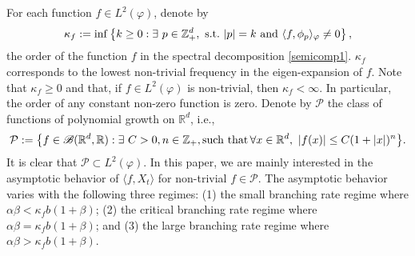 \documentclass[12pt,a4paper]{amsart}
\theoremstyle{plain}
\theoremstyle{definition}
\numberwithin{equation}{section}
\begin{document}
For each function $f\in L^2(\varphi)$, denote by
\begin{equation}
  \kappa_f
  :=\inf \left \{k\geq 0: \exists ~ p\in \mathbb Z_+^d ,{\rm ~s.t.~}|p|=k {\rm ~and~}  \langle f, \phi_p \rangle_{\varphi}\neq 0\right \},
\end{equation}
the order of the function $f$ in the spectral decomposition \eqref{semicomp1}.
$\kappa_f$ corresponds to the lowest non-trivial frequency in the eigen-expansion of $f$.
Note that $ \kappa_f\geq 0$ and that, if $f\in L^2(\varphi)$ is non-trivial, then $\kappa_f<\infty$.
In particular, the order of any constant non-zero function is zero.
Denote by $\mathcal P$ the class of functions of polynomial growth on $\mathbb R^d$, i.e.,
\begin{equation}
  \label{eq: polynomial growth function}
  \mathcal{P}
  :=\big \{f\in \mathscr B(\mathbb R^d, \mathbb R):\exists~ C>0, n \in \mathbb Z_+, {\rm such  \, \, that \, } \forall x\in \mathbb R^d,~ |f(x)|\leq C(1+|x|)^n\big\}.
\end{equation}
It is clear that $\mathcal{P} \subset L^2(\varphi)$.
In this paper, we are mainly interested in the asymptotic behavior of $\langle f, X_t\rangle$ for non-trivial $f\in \mathcal P$.
The asymptotic behavior varies with the following three regimes:
(1) the small branching rate regime where $\alpha\beta<\kappa_fb(1+\beta)$; 
(2) the critical branching rate regime where $\alpha\beta=\kappa_fb(1+\beta)$; and
(3) the large branching rate regime where $\alpha\beta>\kappa_fb(1+\beta)$.

\end{document}

